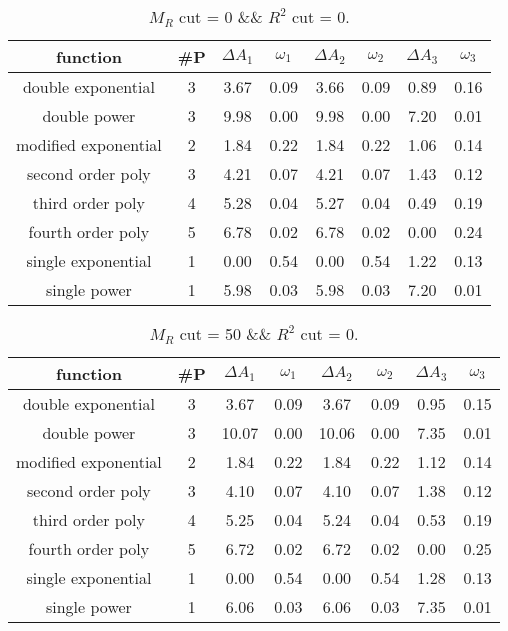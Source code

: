 \begin{table}[H] 
\begin{center} 
\begin{tabular}{|c|c|cc|cc|cc|} 
\hline function & \#P & $\Delta A_1$ & $\omega_1$ & $\Delta A_2$ & $\omega_2$ & $\Delta A_3$ & $\omega_3$ \\ \hline 
double exponential &  3 &   3.67 &   0.09 &   3.66 &   0.09 &   0.89 &   0.16 \\ 
double power &  3 &   9.98 &   0.00 &   9.98 &   0.00 &   7.20 &   0.01 \\ 
modified exponential &  2 &   1.84 &   0.22 &   1.84 &   0.22 &   1.06 &   0.14 \\ 
second order poly &  3 &   4.21 &   0.07 &   4.21 &   0.07 &   1.43 &   0.12 \\ 
third order poly &  4 &   5.28 &   0.04 &   5.27 &   0.04 &   0.49 &   0.19 \\ 
fourth order poly &  5 &   6.78 &   0.02 &   6.78 &   0.02 &   0.00 &   0.24 \\ 
single exponential &  1 &   0.00 &   0.54 &   0.00 &   0.54 &   1.22 &   0.13 \\ 
single power &  1 &   5.98 &   0.03 &   5.98 &   0.03 &   7.20 &   0.01 \\ 
\hline 
\end{tabular} 
\caption{$M_R$ cut = 0 \&\& $R^2$ cut = 0.} 
\label{tab:FitChoices_0_0} 
\end{center} 
\end{table} 
 
 
\begin{table}[H] 
\begin{center} 
\begin{tabular}{|c|c|cc|cc|cc|} 
\hline function & \#P & $\Delta A_1$ & $\omega_1$ & $\Delta A_2$ & $\omega_2$ & $\Delta A_3$ & $\omega_3$ \\ \hline 
double exponential &  3 &   3.67 &   0.09 &   3.67 &   0.09 &   0.95 &   0.15 \\ 
double power &  3 &  10.07 &   0.00 &  10.06 &   0.00 &   7.35 &   0.01 \\ 
modified exponential &  2 &   1.84 &   0.22 &   1.84 &   0.22 &   1.12 &   0.14 \\ 
second order poly &  3 &   4.10 &   0.07 &   4.10 &   0.07 &   1.38 &   0.12 \\ 
third order poly &  4 &   5.25 &   0.04 &   5.24 &   0.04 &   0.53 &   0.19 \\ 
fourth order poly &  5 &   6.72 &   0.02 &   6.72 &   0.02 &   0.00 &   0.25 \\ 
single exponential &  1 &   0.00 &   0.54 &   0.00 &   0.54 &   1.28 &   0.13 \\ 
single power &  1 &   6.06 &   0.03 &   6.06 &   0.03 &   7.35 &   0.01 \\ 
\hline 
\end{tabular} 
\caption{$M_R$ cut = 50 \&\& $R^2$ cut = 0.} 
\label{tab:FitChoices_50_0} 
\end{center} 
\end{table} 
 
